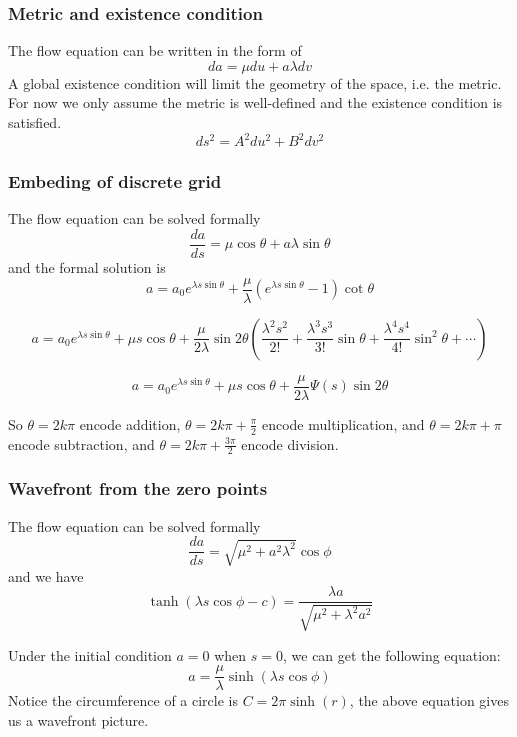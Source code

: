 \documentclass[aspectratio=169]{beamer}
\begin{document}
\begin{frame}
    \frametitle{Metric and existence condition}
    The flow equation can be written in the form of
    \[
        da = \mu du + a \lambda dv
    \]
    A global existence condition will limit the geometry of the space, i.e. the metric.
    For now we only assume the metric is well-defined and the existence condition is satisfied.
    \begin{equation}
        ds^2 = A^2 du^2 + B^2 dv^2\label{eq:metric}
    \end{equation}
\end{frame}

\begin{frame}
    \frametitle{Embeding of discrete grid}
    The flow equation can be solved formally
    \[
        \frac{da}{ds} = \mu \cos \theta + a \lambda \sin \theta
    \]
    and the formal solution is
    \begin{equation}\label{eq:directformalsolution}
    a =  a_0 e^{\lambda s \sin \theta} + \frac{\mu}{\lambda} (e^{\lambda s \sin \theta} - 1) \cot \theta
    \end{equation}

    \[
        a = a_0 e^{\lambda s \sin \theta} + \mu s \cos \theta + \frac{\mu}{2\lambda} \sin 2\theta (\frac{\lambda^2s^2}{2!} + \frac{\lambda^3s^3}{3!} \sin \theta + \frac{\lambda^4s^4}{4!} \sin^2 \theta + \cdots)
    \]

    \[
        a = a_0 e^{\lambda s \sin \theta} + \mu s \cos \theta + \frac{\mu}{2\lambda} \Psi(s) \sin 2\theta
    \]

    So $\theta = 2k\pi$ encode addition, $\theta = 2k\pi + \frac{\pi}{2}$ encode multiplication,
    and $\theta = 2k\pi + \pi$ encode subtraction, and $\theta = 2k\pi + \frac{3\pi}{2}$ encode division.
\end{frame}

\begin{frame}
    \frametitle{Wavefront from the zero points}
    The flow equation can be solved formally
    \[
        \frac{da}{ds} = \sqrt {\mu^2 + a^2 \lambda^2} \cos \phi
    \]
    and we have
    \[
    \tanh(\lambda s \cos \phi - c) = \frac{\lambda a}{\sqrt{\mu^2 + \lambda^2 a^2}}
    \]

    Under the initial condition $a = 0$ when $s = 0$, we can get the following equation:
    \begin{equation}
        a = \frac{\mu}{\lambda} \sinh(\lambda s \cos \phi)\label{eq:gradevo2}
    \end{equation}
    Notice the circumference of a circle is $C = 2 \pi \sinh(r)$, the above equation gives us a wavefront picture.
\end{frame}
\end{document}
